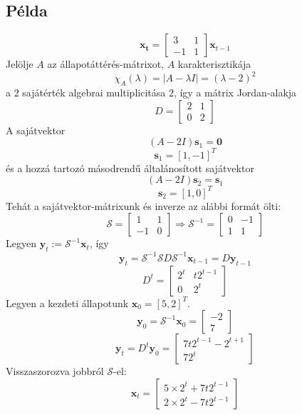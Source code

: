 \documentclass[14p]{article}
\begin{document}
\subsection{Példa}
\[
	\pmb{x_t} = 
	\begin{bmatrix}
	3 & 1 \\
	-1 & 1
	\end{bmatrix} \pmb{x}_{t-1}
\]
Jelölje $A$ az állapotáttérés-mátrixot, $A$ karakterisztikája
\[
	\chi_A(\lambda) = |A - \lambda I| = (\lambda - 2)^2
\]
a $2$ sajátérték algebrai multiplicitása $2$, így a mátrix Jordan-alakja
\[
	D = 
	\begin{bmatrix}
	2 & 1 \\
	0 & 2
	\end{bmatrix}
\]
A sajátvektor
\[
	(A - 2I)\pmb{s}_1 = \mathbf{0}
\]
\[
	\pmb{s}_1 = [1, -1]^T
\]
és a hozzá tartozó másodrendű általánosított sajátvektor
\[
	(A - 2I)\pmb{s}_2 = \pmb{s}_1
\]
\[
	\pmb{s}_2 = [1, 0]^T
\]
Tehát a sajátvektor-mátrixunk és inverze az alábbi formát ölti:
\[
	\mathcal{S} = 
	\begin{bmatrix}
	1 & 1 \\
	-1 & 0
	\end{bmatrix} \Longrightarrow
	\mathcal{S}^{-1} = 
	\begin{bmatrix}
	0 & -1 \\
	1 & 1
	\end{bmatrix}
\]
Legyen $\pmb{y}_t := \mathcal{S}^{-1}\pmb{x}_t$, így
\[
	\pmb{y}_t = \mathcal{S}^{-1}\mathcal{S}D\mathcal{S}^{-1}\pmb{x}_{t-1} = D\pmb{y}_{t-1}
\]
\[
	D^t = 
	\begin{bmatrix}
	2^t & t2^{t-1} \\
	0 & 2^t
	\end{bmatrix}
\]
Legyen a kezdeti állapotunk $\pmb{x}_0 = [5, 2]^T$.
\[
	\pmb{y}_0 = \mathcal{S}^{-1}\pmb{x}_0 = 
	\begin{bmatrix}
	-2 \\
	7
	\end{bmatrix}
\]
\[
	\pmb{y}_t = D^t\pmb{y}_0 = 
	\begin{bmatrix}
	7t2^{t-1} - 2^{t+1} \\
	72^t
	\end{bmatrix}
\]
Visszaszorozva jobbról $\mathcal{S}$-el:
\[
	\pmb{x}_t = 
	\begin{bmatrix}
	5 \times 2^t + 7t2^{t-1} \\
	2 \times 2^t - 7t2^{t-1}
	\end{bmatrix}
\]
\end{document}

